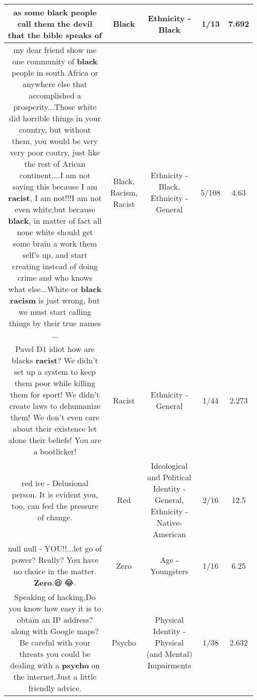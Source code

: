 \documentclass[11pt]{article}
\newlength\mylength
\begin{document}
\begin{center}
\begin{longtable}{|C{.65\mylength}|C{.30\mylength}|C{.12\mylength}|C{.12\mylength}|C{.12\mylength}|}
  \small as some \textbf{black} people call them the devil that the bible speaks of\normalsize   & Black & Ethnicity - Black & 1/13 & 7.692 \\  \hline
  \small {} my dear friend show me one community of \textbf{black} people in south Africa or anywhere else  that accomplished a prosperity...Those white did horrible things in your country, but without them, you would be very very poor coutry, just like the rest of Arican continent....I am not saying this because I am \textbf{racist}, I am not!!!I am not even white,but because \textbf{black}, in matter of fact all none white  should get some brain a work them self's up, and start creating instead of doing crime and who knows what else...White or \textbf{black} \textbf{racism} is just wrong, but we must start calling things by their true names ...\normalsize   & Black, Racism, Racist & Ethnicity - Black, Ethnicity - General & 5/108 & 4.63 \\  \hline
  \small Pavel D1 idiot how are blacks \textbf{racist}? We didn't set up a system to keep them poor while killing them for sport! We didn't create laws to dehumanize them! We don't even care about their existence let alone their beliefs! You are a bootlicker!\normalsize   & Racist & Ethnicity - General & 1/44 & 2.273 \\  \hline
  \small red ice - Delusional person. It is evident you, too, can feel the pressure of change.\normalsize   & Red &  Ideological and Political Identity - General, Ethnicity - Native-American & 2/16 & 12.5 \\  \hline
  \small null null - YOU!!...let go of power? Really? You have no choice in the matter. \textbf{Zero}.😆🤣😂.\normalsize   & Zero & Age - Youngsters & 1/16 & 6.25 \\  \hline
  \small {} Speaking of hacking,Do you know how easy it is to obtain an IP address? along with Google maps? Be careful with your threats you could be dealing with a \textbf{psycho} on the internet.Just a little friendly advice.\normalsize   & Psycho & Physical Identity - Physical (and Mental) Impairments & 1/38 & 2.632 \\  \hline

\end{longtable}
\end{center}
\end{document}
